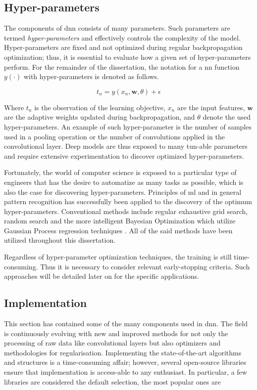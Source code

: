 \subsection{Hyper-parameters}

The components of \gls{dnn} consists of many parameters. Such parameters are termed \emph{hyper-parameters} and effectively controls the complexity of the model. Hyper-parameters are fixed and not optimized during regular backpropagation optimization; thus, it is essential to evaluate how a given set of hyper-parameters perform. For the remainder of the dissertation, the notation for a \gls{nn} function $y(\cdot)$ with hyper-parameters is denoted as follows.

\begin{equation}
    t_n = y(x_n, \mathbf{w}, \theta) + \epsilon
\end{equation}

Where $t_n$ is the observation of the learning objective, $x_n$ are the input features, $\mathbf{w}$ are the adaptive weights updated during backpropagation, and $\theta$ denote the used hyper-parameters. An example of such hyper-parameter is the number of samples used in a pooling operation or the number of convolutions applied in the convolutional layer. Deep models are thus exposed to many tun-able parameters and require extensive experimentation to discover optimized hyper-parameters.

Fortunately, the world of computer science is exposed to a particular type of engineers that has the desire to automatize as many tasks as possible, which is also the case for discovering hyper-parameters. Principles of \gls{ml} and in general pattern recognition has successfully been applied to the discovery of the optimum hyper-parameters. Conventional methods include regular exhaustive grid search, random search and the more intelligent Bayesian Optimization which utilize Gaussian Process regression techniques \cite{YuHyper-ParameterApplications}. All of the said methods have been utilized throughout this dissertation.

Regardless of hyper-parameter optimization techniques, the training is still time-consuming. Thus it is necessary to consider relevant early-stopping criteria. Such approaches will be detailed later on for the specific applications.


\subsection{Implementation}
This section has contained some of the many components used in \gls{dnn}. The field is continuously evolving with new and improved methods for not only the processing of raw data like convolutional layers but also optimizers and methodologies for regularisation.  Implementing the state-of-the-art algorithms and structures is a time-consuming affair; however, several open-source libraries ensure that implementation is access-able to any enthusiast. In particular, a few libraries are considered the default selection, the most popular ones are 


